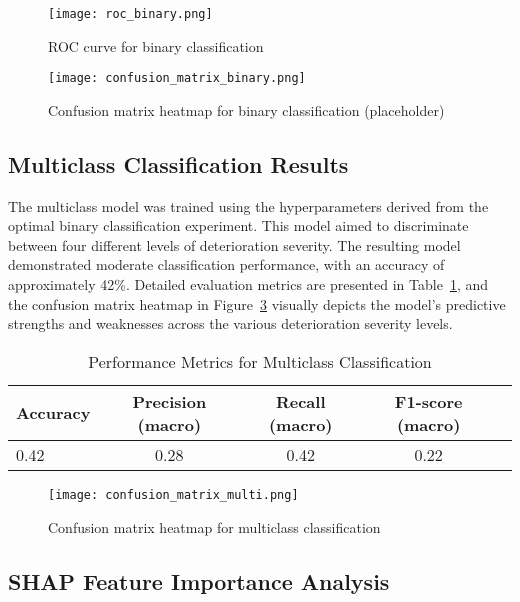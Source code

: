 \documentclass[conference]{IEEEtran}
\begin{document}
\begin{figure}[htbp] \centering \texttt{[image: roc\_binary.png]} \caption{ROC curve for binary classification} \label{fig:roc_binary} \end{figure}

\begin{figure}[htbp] \centering \texttt{[image: confusion\_matrix\_binary.png]} \caption{Confusion matrix heatmap for binary classification (placeholder)} \label{fig:confusion_matrix_binary} \end{figure}

\subsection{Multiclass Classification Results}

The multiclass model was trained using the hyperparameters derived from the optimal binary classification experiment. This model aimed to discriminate between four different levels of deterioration severity. The resulting model demonstrated moderate classification performance, with an accuracy of approximately 42\%. Detailed evaluation metrics are presented in Table~\ref{tab:multiclass_metrics}, and the confusion matrix heatmap in Figure~\ref{fig:confusion_matrix_multi} visually depicts the model’s predictive strengths and weaknesses across the various deterioration severity levels.

\begin{table}[htbp]
\centering
\caption{Performance Metrics for Multiclass Classification}
\label{tab:multiclass_metrics}
\begin{tabular}{lcccc}
\hline
\textbf{Accuracy} & \textbf{Precision (macro)} & \textbf{Recall (macro)} & \textbf{F1-score (macro)} \\
\hline
0.42 & 0.28 & 0.42 & 0.22 \\
\hline
\end{tabular}
\end{table}

\begin{figure}[htbp] \centering \texttt{[image: confusion\_matrix\_multi.png]} \caption{Confusion matrix heatmap for multiclass classification} \label{fig:confusion_matrix_multi} \end{figure}

\subsection{SHAP Feature Importance Analysis}
\end{document}
